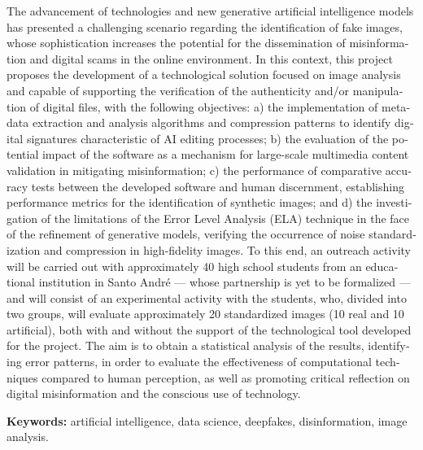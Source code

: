 \newpage
{}
\justifying
\begin{otherlanguage}{english}
The advancement of technologies and new generative artificial intelligence models
has presented a challenging scenario regarding the identification of fake images,
whose sophistication increases the potential for the dissemination of
misinformation and digital scams in the online environment. In this context, this
project proposes the development of a technological solution focused on image
analysis and capable of supporting the verification of the authenticity and/or
manipulation of digital files, with the following objectives: a) the
implementation of metadata extraction and analysis algorithms and compression
patterns to identify digital signatures characteristic of AI editing processes;
b) the evaluation of the potential impact of the software as a mechanism for
large-scale multimedia content validation in mitigating misinformation; c) the
performance of comparative accuracy tests between the developed software and
human discernment, establishing performance metrics for the identification of
synthetic images; and d) the investigation of the limitations of the Error Level
Analysis (ELA) technique in the face of the refinement of generative models,
verifying the occurrence of noise standardization and compression in
high-fidelity images. To this end, an outreach activity will be carried out with
approximately 40 high school students from an educational institution in Santo
André --- whose partnership is yet to be formalized --- and will consist of an
experimental activity with the students, who, divided into two groups, will
evaluate approximately 20 standardized images (10 real and 10 artificial), both
with and without the support of the technological tool developed for the project.
The aim is to obtain a statistical analysis of the results, identifying error
patterns, in order to evaluate the effectiveness of computational techniques
compared to human perception, as well as promoting critical reflection on digital
misinformation and the conscious use of technology.

\vspace{5mm}
\noindent\textbf{Keywords:} artificial intelligence, data science, deepfakes,
disinformation, image analysis.
\end{otherlanguage}

